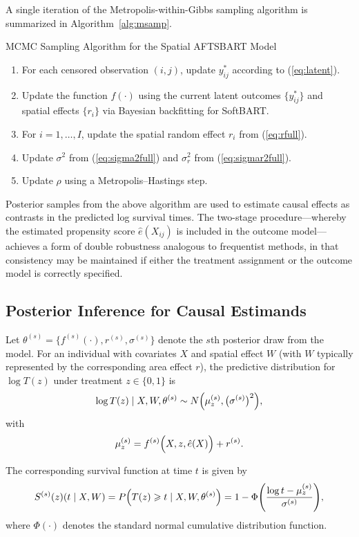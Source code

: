 \documentclass[useAMS,referee]{biom}
\begin{document}
A single iteration of the Metropolis-within-Gibbs sampling algorithm is summarized in Algorithm~\ref{alg:msamp}.

\begin{algorithm}[H]
\caption{MCMC Sampling Algorithm for the Spatial AFTSBART Model}\label{alg:msamp}
\begin{enumerate}
    \item For each censored observation \((i,j)\), update \(y_{ij}^\ast\) according to (\ref{eq:latent}).
    \item Update the function \(f(\cdot)\) using the current latent outcomes \(\{y_{ij}^\ast\}\) and spatial effects \(\{r_i\}\) via Bayesian backfitting for SoftBART.
    \item For \(i=1,\ldots,I\), update the spatial random effect \(r_i\) from (\ref{eq:rfull}).
    \item Update \(\sigma^2\) from (\ref{eq:sigma2full}) and \(\sigma_r^2\) from (\ref{eq:sigmar2full}).
    \item Update \(\rho\) using a Metropolis--Hastings step.
\end{enumerate}
\end{algorithm}

Posterior samples from the above algorithm are used to estimate causal effects as contrasts in the predicted log survival times. The two-stage procedure—whereby the estimated propensity score \(\hat{e}(X_{ij})\) is included in the outcome model—achieves a form of double robustness analogous to frequentist methods, in that consistency may be maintained if either the treatment assignment or the outcome model is correctly specified.

\subsection{Posterior Inference for Causal Estimands}

Let \(\theta^{(s)} = \{f^{(s)}(\cdot), r^{(s)}, \sigma^{(s)}\}\) denote the \(s\)th posterior draw from the model. For an individual with covariates \(X\) and spatial effect \(W\) (with \(W\) typically represented by the corresponding area effect \(r\)), the predictive distribution for \(\log T(z)\) under treatment \(z \in \{0,1\}\) is
\[
\log T(z) \mid X, W, \theta^{(s)} \sim N\Bigl(\mu_z^{(s)}, \bigl(\sigma^{(s)}\bigr)^2\Bigr),
\]
with
\[
\mu_z^{(s)} = f^{(s)}\Bigl(X, z, \hat{e}(X)\Bigr) + r^{(s)}.
\]

The corresponding survival function at time \(t\) is given by
\[
S^{(s)}(z)(t\mid X,W) = P\Bigl(T(z) \ge t \mid X,W,\theta^{(s)}\Bigr) = 1 - \Phi\Biggl(\frac{\log t - \mu_z^{(s)}}{\sigma^{(s)}}\Biggr),
\]
where \(\Phi(\cdot)\) denotes the standard normal cumulative distribution function.
\end{document}
